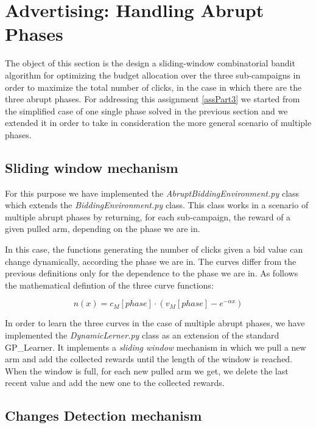 \chapter{Advertising: Handling Abrupt Phases}

The object of this section is the design a sliding-window combinatorial bandit algorithm for optimizing the budget allocation over the three sub-campaigns in order to maximize the total number of clicks, in the case in which there are the three abrupt phases.
For addressing this assignment \ref{assPart3} we started from the simplified case of one single phase solved in the previous section and we extended it in order to take in consideration the more general scenario of multiple phases.\\

\section{Sliding window mechanism}
For this purpose we have implemented the \textit{AbruptBiddingEnvironment.py} class which extends the \textit{BiddingEnvironment.py} class. This class works in a scenario of multiple abrupt phases by returning, for each sub-campaign, the reward of a given pulled arm, depending on the phase we are in.

In this case, the functions generating  the number of clicks given a bid value can change dynamically, according the phase we are in.
The curves differ from the previous definitions only for the dependence to the phase we are in. As follows the mathematical defintion of the three curve functions:

\begin{equation}
	n(x) = c_{M}[phase] \cdot (v_{M}[phase] - e^{-\alpha x})
\end{equation}

In order to learn the three curves in the case of multiple abrupt phases, we have implemented the \textit{DynamicLerner.py} class as an extension of the standard GP\_Learner.
It implements a \textit{sliding window} mechanism in which we pull a new arm and add the collected rewards until the length of the window is reached. When the window is full, for each new pulled arm we get, we delete the last recent value and add the new one to the collected rewards.

\section{Changes Detection mechanism}


